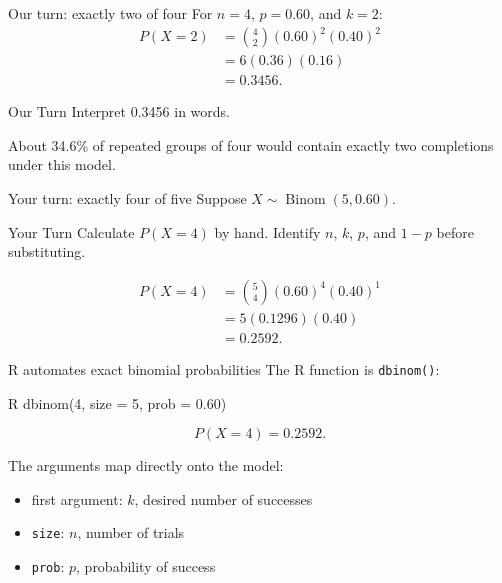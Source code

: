 \documentclass[11pt,aspectratio=169]{beamer}
\newcommand{\yourturn}[1]{%
\begin{center}
\begin{minipage}{0.90\textwidth}
\begin{alertblock}{Your Turn}
#1
\end{alertblock}
\end{minipage}
\end{center}}
\newcommand{\ourturn}[1]{%
\begin{center}
\begin{minipage}{0.90\textwidth}
\begin{block}{Our Turn}
#1
\end{block}
\end{minipage}
\end{center}}
\begin{document}
\begin{frame}{Our turn: exactly two of four}
For $n=4$, $p=0.60$, and $k=2$:
\begin{align*}
P(X=2)
&={4\choose 2}(0.60)^2(0.40)^2\\
&=6(0.36)(0.16)\\
&=\boxed{0.3456}.
\end{align*}

\ourturn{Interpret 0.3456 in words.}

\pause
About 34.6\% of repeated groups of four would contain exactly two completions under this model.
\end{frame}

\begin{frame}{Your turn: exactly four of five}
Suppose $X\sim\operatorname{Binom}(5,0.60)$.

\yourturn{Calculate $P(X=4)$ by hand. Identify $n$, $k$, $p$, and $1-p$ before substituting.}

\pause
\begin{align*}
P(X=4)
&={5\choose4}(0.60)^4(0.40)^1\\
&=5(0.1296)(0.40)\\
&=\boxed{0.2592}.
\end{align*}
\end{frame}

\begin{frame}{R automates exact binomial probabilities}
The R function is \texttt{dbinom()}:

\begin{block}{R}
\ttfamily
dbinom(4, size = 5, prob = 0.60)
\end{block}

\[
P(X=4)=0.2592.
\]

\vfill
The arguments map directly onto the model:
\begin{itemize}
  \item first argument: $k$, desired number of successes
  \item \texttt{size}: $n$, number of trials
  \item \texttt{prob}: $p$, probability of success
\end{itemize}
\end{frame}
\end{document}

